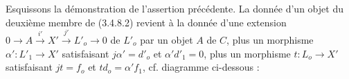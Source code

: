 Esquissons la démonstration de l'assertion précédente. La donnée d'un objet du deuxième membre de (3.4.8.2) revient à la donnée d'une extension $0 \longrightarrow A \stackrel{i'}{\longrightarrow} X' \stackrel{j'}{\longrightarrow} L'_o \longrightarrow 0$ de $L'_o$ par un objet $A$ de $C$, plus un morphisme $\alpha' : L'_1 \longrightarrow X'$ satisfaisant $j\alpha' = d'_o$ et $\alpha'd'_1 = 0$, plus un morphisme $t : L_o \longrightarrow X'$ satisfaisant $jt = f_o$ et $td_o = \alpha'f_1$, cf. diagramme ci-dessous :

\begin{center}
\end{center}
